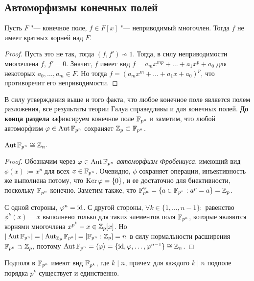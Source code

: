\subsection{Автоморфизмы конечных полей}

\begin{proposition}
	Пусть $F$ "--- конечное поле, $f \in F[x]$ "--- неприводимый многочлен. Тогда $f$ не имеет кратных корней над $\overline{F}$.
\end{proposition}

\begin{proof}
	Пусть это не так, тогда $(f, f') \not\sim 1$. Тогда, в силу неприводимости многочлена $f$, $f' = 0$. Значит, $f$ имеет вид $f = a_mx^{mp} + \dotsc + a_1x^p + a_0$ для некоторых $a_0, \dotsc, a_m \in F$. Но тогда $f = (a_mx^{m} + \dotsc + a_1x + a_0)^p$, что противоречит его неприводимости.
\end{proof}

В силу утверждения выше и того факта, что любое конечное поле является полем разложения, все результаты теории Галуа справедливы и для конечных полей. \textbf{До конца раздела} зафиксируем конечное поле $\mathbb{F}_{p^n}$ и заметим, что любой автоморфизм $\varphi \in \operatorname{Aut}\mathbb{F}_{p^n}$ сохраняет $\mathbb{Z}_p \subset \mathbb{F}_{p^n}$.

\begin{theorem}
	$\operatorname{Aut}\mathbb{F}_{p^n} \cong \mathbb{Z}_n$.
\end{theorem}

\begin{proof}
	Обозначим через $\varphi \in \operatorname{Aut}\mathbb{F}_{p^n}$ \textit{автоморфизм Фробениуса}, имеющий вид $\phi(x) := x^p$ для всех $x \in \mathbb{F}_{p^n}$. Очевидно, $\phi$ сохраняет операции, инъективность же выполнена потому, что $\operatorname{Ker}\varphi = \{0\}$, и ее достаточно для биективности, поскольку $\mathbb{F}_{p^n}$ конечно. Заметим также, что $\mathbb{F}_{p^n}^{\varphi} = \{a \in \mathbb{F}_{p^n} : a^p = a\} = \mathbb{Z}_p$.
	
	С одной стороны, $\varphi^n = \operatorname{id}$. С другой стороны, $\forall k \in \{1, 
	\dotsc, n - 1\}:$ равенство $\phi^k(x) = x$ выполнено только для таких элементов поля $\mathbb{F}_{p^n}$, которые являются корнями многочлена $x^{p^k} - x \in \mathbb{Z}_p[x]$.  Но $|\operatorname{Aut}\mathbb{F}_{p^n}| = |\operatorname{Aut}_{\mathbb{Z}_p}\mathbb{F}_{p^n}| = [\mathbb{F}_{p^n} : \mathbb{Z}_p] = n$ в силу нормальности расширения $\mathbb{F}_{p^n} \supset \mathbb{Z}_p$, поэтому $\operatorname{Aut}\mathbb{F}_{p^n} = \langle\varphi\rangle = \{\operatorname{id}, \varphi, \dotsc, \varphi^{n-1}\} \cong \mathbb{Z}_n$.
\end{proof}

\begin{corollary}
	Подполя в $\mathbb{F}_{p^n}$ имеют вид $\mathbb{F}_{p^k}$, где $k \mid n$, причем для каждого $k \mid n$ подполе порядка $p^k$ существует и единственно.
\end{corollary}

